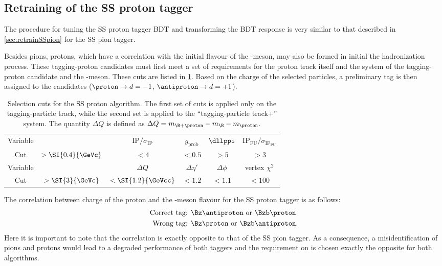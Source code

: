 \subsection{Retraining of the SS proton tagger}
\label{sec:retrainSSproton}

The procedure for tuning the SS proton tagger BDT and transforming the BDT response is very similar to that described in \cref{sec:retrainSSpion} for the SS pion tagger.

Besides pions, protons, which have a correlation with the initial flavour of the \B-meson, may also be formed in initial the hadronization process.
These tagging-proton candidates must first meet a set of requirements for the proton track itself and the system of the tagging-proton candidate and the \B-meson.
These cuts are listed in \cref{tab:selectionSSProton}.
Based on the charge of the selected particles, a preliminary tag is then assigned to the \B candidates ($\proton\rightarrow  d=-1$, $\antiproton\rightarrow d=+1$).
\begin{table}[bp]
	\centering
	\caption{Selection cuts for the SS proton algorithm.
	The first set of cuts is applied only on the tagging-particle track, while the second set is applied to the \enquote{tagging-particle track+\B} system.
	The quantity $\Delta Q$ is defined as $\Delta Q=m_{\B+\proton}-m_{\B}-m_{\proton}$.}
	\begin{tabular}{cccccc}
		\toprule
		Variable & \pt & $\text{IP}/\sigma_\text{IP}$ & $g_\text{prob}$ & $\dllppi$ & $\text{IP}_\text{PU}/\sigma_{\text{IP}_\text{PU}}$ \\
		Cut & $>\SI{0.4}{\GeVc}$ & $<4$ & $<0.5$ & $>5$ & $>3$ \\
		\midrule
		Variable & \pt & $\Delta Q$ & $\Delta\eta'$ & $\Delta\phi$  & vertex $\chi^2$ \\
		Cut & $>\SI{3}{\GeVc}$ & $<\SI{1.2}{\GeVcc}$ & $<1.2$ & $<1.1$ & $<100$ \\
		\bottomrule
	\end{tabular}
	\label{tab:selectionSSProton}
\end{table}

The correlation between charge of the proton and the \B-meson flavour for the SS proton tagger is as follows:
\begin{align*}
	\text{Correct tag: }& \Bz\antiproton \text{ or } \Bzb\proton\\
	\text{Wrong tag: }& \Bz\proton \text{ or } \Bzb\antiproton.
\end{align*}
Here it is important to note that the correlation is exactly opposite to that of the SS pion tagger.
As a consequence, a misidentification of pions and protons would lead to a degraded performance of both taggers and the requirement on \dllppi is chosen exactly the opposite for both algorithms.

